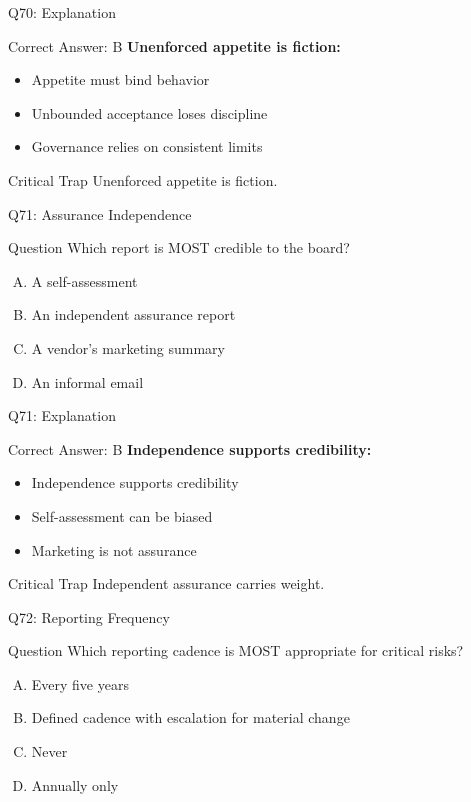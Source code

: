 \documentclass{beamer}
\begin{document}
	\begin{frame}{Q70: Explanation}
		\begin{block}{Correct Answer: B}
			\textbf{Unenforced appetite is fiction:}
			\begin{itemize}
				\item Appetite must bind behavior
				\item Unbounded acceptance loses discipline
				\item Governance relies on consistent limits
			\end{itemize}
		\end{block}
		\begin{alertblock}{Critical Trap}
			Unenforced appetite is fiction.
		\end{alertblock}
	\end{frame}
	
	\begin{frame}{Q71: Assurance Independence}
		\begin{block}{Question}
			Which report is MOST credible to the board?
		\end{block}
		\begin{enumerate}[(A)]
			\item A self-assessment
			\item An independent assurance report
			\item A vendor's marketing summary
			\item An informal email
		\end{enumerate}
	\end{frame}
	
	\begin{frame}{Q71: Explanation}
		\begin{block}{Correct Answer: B}
			\textbf{Independence supports credibility:}
			\begin{itemize}
				\item Independence supports credibility
				\item Self-assessment can be biased
				\item Marketing is not assurance
			\end{itemize}
		\end{block}
		\begin{alertblock}{Critical Trap}
			Independent assurance carries weight.
		\end{alertblock}
	\end{frame}
	
	\begin{frame}{Q72: Reporting Frequency}
		\begin{block}{Question}
			Which reporting cadence is MOST appropriate for critical risks?
		\end{block}
		\begin{enumerate}[(A)]
			\item Every five years
			\item Defined cadence with escalation for material change
			\item Never
			\item Annually only
		\end{enumerate}
	\end{frame}
	
\end{document}
